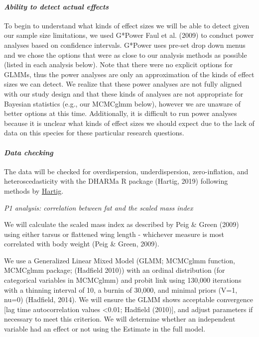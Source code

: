 \documentclass[
]{article}
\begin{document}
\hypertarget{ability-to-detect-actual-effects}{%
\paragraph{\texorpdfstring{\emph{Ability to detect actual
effects}}{Ability to detect actual effects}}\label{ability-to-detect-actual-effects}}

To begin to understand what kinds of effect sizes we will be able to
detect given our sample size limitations, we used G*Power Faul et al.
(2009) to conduct power analyses based on confidence intervals. G*Power
uses pre-set drop down menus and we chose the options that were as close
to our analysis methods as possible (listed in each analysis below).
Note that there were no explicit options for GLMMs, thus the power
analyses are only an approximation of the kinds of effect sizes we can
detect. We realize that these power analyses are not fully aligned with
our study design and that these kinds of analyses are not appropriate
for Bayesian statistics (e.g., our MCMCglmm below), however we are
unaware of better options at this time. Additionally, it is difficult to
run power analyses because it is unclear what kinds of effect sizes we
should expect due to the lack of data on this species for these
particular research questions.

\hypertarget{data-checking}{%
\paragraph{\texorpdfstring{\emph{Data
checking}}{Data checking}}\label{data-checking}}

The data will be checked for overdispersion, underdispersion,
zero-inflation, and heteroscedasticity with the DHARMa R package
(Hartig, 2019) following methods by
\href{https://cran.r-project.org/web/packages/DHARMa/vignettes/DHARMa.html}{Hartig}.

\emph{P1 analysis: correlation between fat and the scaled mass index}

We will calculate the scaled mass index as described by Peig \& Green
(2009) using either tarsus or flattened wing length - whichever measure
is most correlated with body weight (Peig \& Green, 2009).

We use a Generalized Linear Mixed Model (GLMM; MCMCglmm function,
MCMCglmm package; (Hadfield 2010)) with an ordinal distribution (for
categorical variables in MCMCglmm) and probit link using 130,000
iterations with a thinning interval of 10, a burnin of 30,000, and
minimal priors (V=1, nu=0) (Hadfield, 2014). We will ensure the GLMM
shows acceptable convergence {[}lag time autocorrelation values
\textless0.01; Hadfield (2010){]}, and adjust parameters if necessary to
meet this criterion. We will determine whether an independent variable
had an effect or not using the Estimate in the full model.
\end{document}
